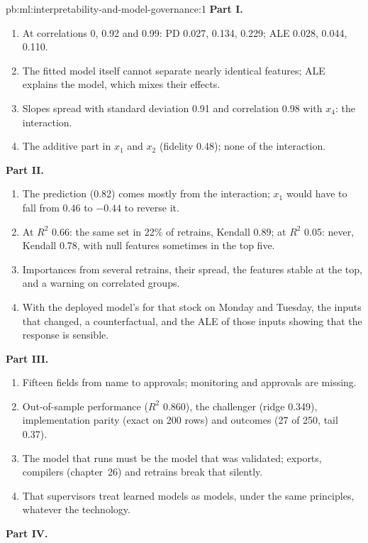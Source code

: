 \begin{solution}{pb:ml:interpretability-and-model-governance:1}
\textbf{Part I.}
\begin{enumerate}
\item At correlations 0, 0.92 and 0.99: PD 0.027, 0.134, 0.229; ALE 0.028, 0.044, 0.110.
\item The fitted model itself cannot separate nearly identical features; ALE explains the model, which mixes their effects.
\item Slopes spread with standard deviation 0.91 and correlation 0.98 with $x_4$: the interaction.
\item The additive part in $x_1$ and $x_2$ (fidelity 0.48); none of the interaction.
\end{enumerate}
\textbf{Part II.}
\begin{enumerate}[resume]
\item The prediction (0.82) comes mostly from the interaction; $x_1$ would have to fall from 0.46 to $-0.44$ to reverse it.
\item At $R^2$ 0.66: the same set in 22\% of retrains, Kendall 0.89; at $R^2$ 0.05: never, Kendall 0.78, with null features
sometimes in the top five.
\item Importances from several retrains, their spread, the features stable at the top, and a warning on correlated groups.
\item With the deployed model's  for that stock on Monday and Tuesday, the inputs that changed, a counterfactual,
and the ALE of those inputs showing that the response is sensible.
\end{enumerate}
\textbf{Part III.}
\begin{enumerate}[resume]
\item Fifteen fields from name to approvals; monitoring and approvals are missing.
\item Out-of-sample performance ($R^2$ 0.860), the challenger (ridge 0.349), implementation parity (exact on 200 rows) and
outcomes (27 of 250, tail 0.37).
\item The model that runs must be the model that was validated; exports, compilers (chapter~26) and retrains break that silently.
\item That supervisors treat learned models as models, under the same principles, whatever the technology.
\end{enumerate}
\textbf{Part IV.}
\begin{enumerate}[resume]

\end{enumerate}
\end{solution}
